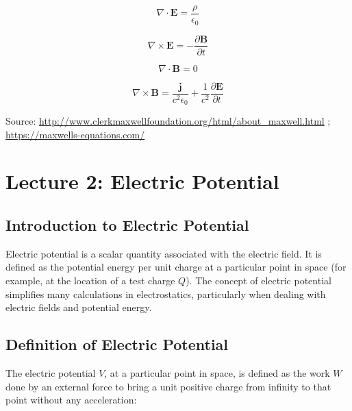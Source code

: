 \documentclass[
  letterpaper,
  DIV=11,
  numbers=noendperiod]{scrreprt}
\begin{document}
\begin{equation}

\nabla \cdot \mathbf{E} = \frac{\rho}{\epsilon_0}
\end{equation}

\begin{equation}
\nabla \times \mathbf{E} = - \frac{\partial \mathbf{B}}{\partial t} 
\end{equation}

\begin{equation}
\nabla \cdot \mathbf{B} = 0
\end{equation}

\begin{equation}
\nabla \times \mathbf{B} = \frac{\mathbf{j}}{c^2 \epsilon_0} + \frac{1}{c^2} \frac{\partial \mathbf{E}}{\partial t}
\end{equation}

Source:
\url{http://www.clerkmaxwellfoundation.org/html/about_maxwell.html} ;
\url{https://maxwells-equations.com/}


\chapter{Lecture 2: Electric
Potential}\label{lecture-2-electric-potential}

\newcommand{\l}{\mathrm{\mathbf{l}}}

\section{Introduction to Electric
Potential}\label{introduction-to-electric-potential}

Electric potential is a scalar quantity associated with the electric
field. It is defined as the potential energy per unit charge at a
particular point in space (for example, at the location of a test charge
\(Q\)). The concept of electric potential simplifies many calculations
in electrostatics, particularly when dealing with electric fields and
potential energy.

\section{Definition of Electric
Potential}\label{definition-of-electric-potential}

The electric potential \(V\), at a particular point in space, is defined
as the work \(W\) done by an external force to bring a unit positive
charge from infinity to that point without any acceleration:
\end{document}

